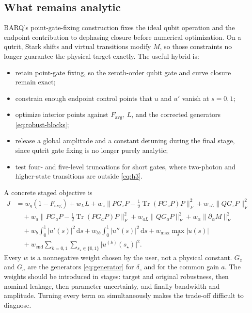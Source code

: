\documentclass[11pt,a4paper]{article}
\theoremstyle{definition}
\newcommand{\abs}[1]{\lvert #1\rvert}
\newcommand{\norm}[1]{\lVert #1\rVert}
\newcommand{\Tr}{\operatorname{Tr}}
\newcommand{\dd}{\mathrm{d}}
\begin{document}
\subsection{What remains analytic}

BARQ's point-gate-fixing construction fixes the ideal qubit operation and the
endpoint contribution to dephasing closure before numerical optimization.  On
a qutrit, Stark shifts and virtual transitions modify \(M\), so those
constraints no longer guarantee the physical target exactly.  The useful hybrid
is:

\begin{itemize}
  \item retain point-gate fixing, so the zeroth-order qubit gate and curve
        closure remain exact;
  \item constrain enough endpoint control points that \(u\) and \(u'\) vanish
        at \(s=0,1\);
  \item optimize interior points against \(F_{\mathrm{avg}}\), \(L\), and the
        corrected generators \eqref{eq:robust-blocks};
  \item release a global amplitude and a constant detuning during the final
        stage, since qutrit gate fixing is no longer purely analytic;
  \item test four- and five-level truncations for short gates, where
        two-photon and higher-state transitions are outside \eqref{eq:h3}.
\end{itemize}

A concrete staged objective is
\begin{equation}
\label{eq:J}
\begin{aligned}
  J&=w_g(1-F_{\mathrm{avg}})+w_L L
    +w_z\norm{PG_zP-\tfrac12\Tr(PG_zP)P}_F^2
    +w_{zL}\norm{QG_zP}_F^2 \\
   &\quad+w_a\norm{PG_aP-\tfrac12\Tr(PG_aP)P}_F^2
    +w_{aL}\norm{QG_aP}_F^2
    +w_\alpha\norm{\partial_\alpha M}_F^2 \\
   &\quad+w_b\int_0^1\abs{u'(s)}^2\,\dd s
    +w_{bb}\int_0^1\abs{u''(s)}^2\,\dd s
    +w_{\max}\max_s\abs{u(s)} \\
   &\quad+w_{\mathrm{end}}\sum_{k=0,1}\sum_{s_\star\in\{0,1\}}\abs{u^{(k)}(s_\star)}^2.
\end{aligned}
\end{equation}
Every \(w\) is a nonnegative weight chosen by the user, not a physical
constant.  \(G_z\) and \(G_a\) are the generators \eqref{eq:generator} for
\(\delta_z\) and for the common gain \(a\).  The weights should be introduced
in stages: target and original robustness,
then nominal leakage, then parameter uncertainty, and finally bandwidth and
amplitude.  Turning every term on simultaneously makes the trade-off difficult
to diagnose.
\end{document}
